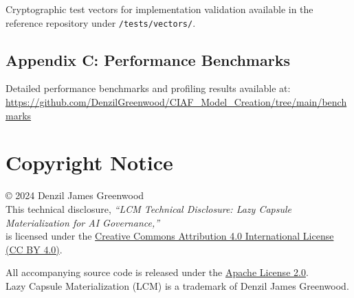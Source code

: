\documentclass[12pt,a4paper]{article}
\begin{document}
Cryptographic test vectors for implementation validation available in the reference repository under \texttt{/tests/vectors/}.

\subsection*{Appendix C: Performance Benchmarks}

Detailed performance benchmarks and profiling results available at: \\
\url{https://github.com/DenzilGreenwood/CIAF_Model_Creation/tree/main/benchmarks}

\section*{Copyright Notice}

© 2024 Denzil James Greenwood \\
This technical disclosure, \textit{``LCM Technical Disclosure: Lazy Capsule Materialization for AI Governance,''} \\
is licensed under the \href{https://creativecommons.org/licenses/by/4.0/}{Creative Commons Attribution 4.0 International License (CC BY 4.0)}.

All accompanying source code is released under the \href{https://www.apache.org/licenses/LICENSE-2.0}{Apache License 2.0}. \\
Lazy Capsule Materialization (LCM)\texttrademark{} is a trademark of Denzil James Greenwood.
\end{document}
